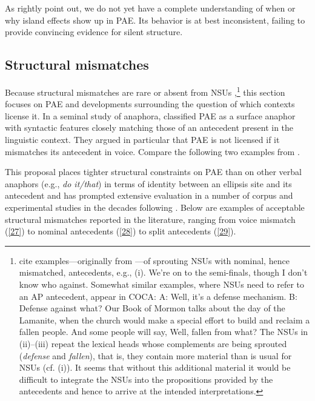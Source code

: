 {
\zl
%
As \citet{Ginzburg2018} rightly point out, we do not yet have a complete understanding of when or why island effects show up in PAE. Its behavior is at best inconsistent, failing to provide convincing evidence for silent structure.


\subsection{Structural mismatches}
\label{sec-structural-mismatches}

Because structural mismatches are rare or absent from NSUs \citep[see][]{Merchant2005a, Merchant2013},\footnote{\citet{Ginzburg2018} cite examples---originally from \citet{Beecher2008}---of sprouting NSUs with nominal, hence mismatched, antecedents, e.g., (i).
	\ea We're on to the semi-finals, though I don't know who against.\z
%
	Somewhat similar examples, where NSUs need to refer to an AP antecedent, appear in COCA:
%
	\ea  A: Well, it's a defense mechanism. B: Defense against what?\z
	\ea Our Book of Mormon talks about the day of the Lamanite, when the church would make a special effort to build and reclaim a fallen people. And some people will say, Well, fallen from what? \z
%
	The NSUs in (ii)--(iii) repeat the lexical heads whose complements are being sprouted (\textit{defense} and \textit{fallen}), that is, they contain more material than is usual for NSUs (cf. (i)). It seems that without this additional material it would be difficult to integrate the NSUs into the propositions provided by the antecedents and hence to arrive at the intended interpretations.} this section focuses on PAE and developments surrounding the question of which contexts license it. In a seminal study of anaphora, \citet{Hankamer1976} classified PAE as a surface anaphor with syntactic features closely matching those of an antecedent present in the linguistic context. They argued in particular that PAE is not licensed if it mismatches its antecedent in voice. Compare the following two examples from \citet[327]{Hankamer1976}.

\eal
{}
\zl
This proposal places tighter structural constraints on PAE than on other verbal anaphors (e.g., \textit{do it/that}) in terms of identity between an ellipsis site and its antecedent and has prompted extensive evaluation in a number of corpus and experimental studies in the decades following \citet{Hankamer1976}. Below are examples of acceptable structural mismatches reported in the literature, ranging from voice mismatch (\ref{27}) to nominal antecedents (\ref{28}) to split antecedents (\ref{29}).

}
